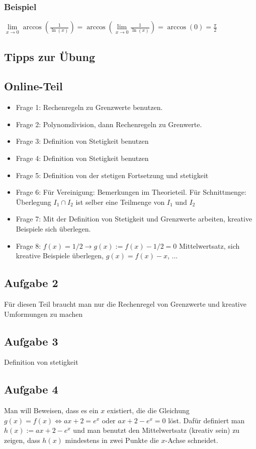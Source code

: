 \documentclass[11pt]{article} %
\begin{document}
\subsubsection{Beispiel}
$\lim\limits_{x\rightarrow 0} \arccos(\frac{1}{\ln(x)}) = \arccos(\lim\limits_{x\rightarrow 0} \frac{1}{\ln(x)}) = \arccos(0) = \frac{\pi}{2}$


\subsection{Tipps zur Übung}

\subsection{Online-Teil}
\begin{itemize}
\item Frage 1: Rechenregeln zu Grenzwerte benutzen.
\item Frage 2: Polynomdivision, dann Rechenregeln zu Grenwerte.
\item Frage 3: Definition von Stetigkeit benutzen
\item Frage 4: Definition von Stetigkeit benutzen
\item Frage 5: Definition von der stetigen Fortsetzung und stetigkeit
\item Frage 6: Für Vereinigung: Bemerkungen im Theorieteil. Für Schnittmenge: Überlegung $I_1 \cap I_2 $ ist selber eine Teilmenge von $I_1$ und $I_2$
\item Frage 7: Mit der Definition von Stetigkeit und Grenzwerte arbeiten, kreative Beispiele sich überlegen.
\item Frage 8: $f(x) = 1/2 \rightarrow g(x):= f(x) - 1/2 = 0$  Mittelwertsatz, sich kreative Beispiele überlegen, $g(x) = f(x) - x$, ...
\end{itemize}

\subsection{Aufgabe 2}
Für diesen Teil braucht man nur die Rechenregel von Grenzwerte und kreative Umformungen zu machen

\subsection{Aufgabe 3}
Definition von stetigkeit

\subsection{Aufgabe 4}

Man will Beweisen, dass es ein $x$ existiert, die die Gleichung $g(x) = f(x) \Leftrightarrow ax + 2 = e^x$ oder $ax+2 -e^x = 0$ löst. Dafür definiert man $h(x) := ax + 2 - e^x$ und man benutzt den Mittelwertsatz (kreativ sein) zu zeigen, dass $h(x)$ mindestens in zwei Punkte die $x$-Achse schneidet. 
\end{document}
